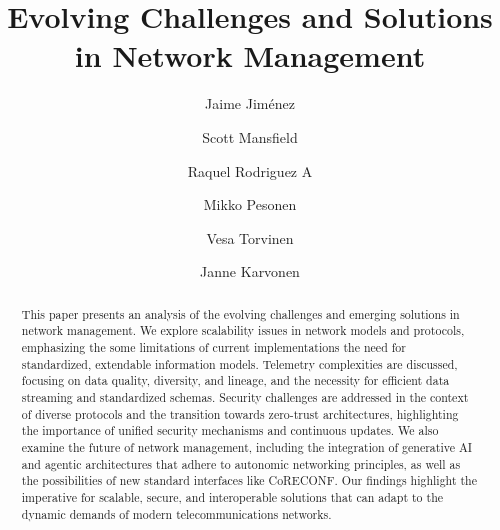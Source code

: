 \documentclass[10pt,sigconf]{iabart}
\begin{document}
\title{Evolving Challenges and Solutions in Network Management}


\author{Jaime Jiménez}

\author{Scott Mansfield}

\author{Raquel Rodriguez A}

\author{Mikko Pesonen}

\author{Vesa Torvinen}

\author{Janne Karvonen}


\begin{abstract}

This paper presents an analysis of the evolving challenges and emerging solutions in network management. We explore scalability issues in network models and protocols, emphasizing the some limitations of current implementations the need for standardized, extendable information models. Telemetry complexities are discussed, focusing on data quality, diversity, and lineage, and the necessity for efficient data streaming and standardized schemas. Security challenges are addressed in the context of diverse protocols and the transition towards zero-trust architectures, highlighting the importance of unified security mechanisms and continuous updates. We also examine the future of network management, including the integration of generative AI and agentic architectures that adhere to autonomic networking principles, as well as the possibilities of new standard interfaces like CoRECONF. Our findings highlight the imperative for scalable, secure, and interoperable solutions that can adapt to the dynamic demands of modern telecommunications networks.

\end{abstract}
\end{document}
